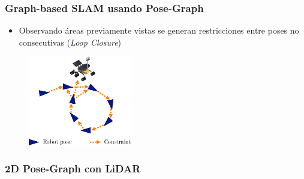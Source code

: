 \begin{frame}
    \frametitle{Graph-based SLAM usando Pose-Graph}
    
    \begin{itemize}
    	\item Observando áreas previamente vistas se generan restricciones entre poses no consecutivas (\emph{Loop Closure})
    \end{itemize}
    
   	\begin{figure}[!h]
    	\includegraphics[width=0.4\textwidth]{images/pose_graph_loop_example.pdf}
    \end{figure}
    
\end{frame}

\begin{frame}[fragile]
    \frametitle{2D Pose-Graph con LiDAR}
        
	\begin{center}
    \end{center}
    
\end{frame}


